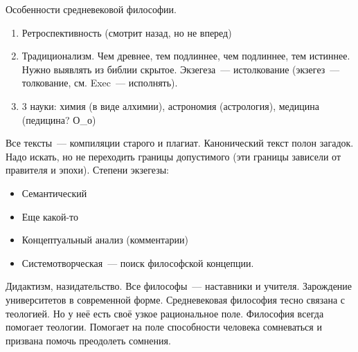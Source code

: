 Особенности средневековой философии.
\begin{enumerate}
	\item Ретроспективность (смотрит назад, но не вперед) 
	\item Традиционализм. Чем древнее, тем подлиннее, чем подлиннее, тем истиннее. Нужно выявлять из библии скрытое. Экзегеза~--- истолкование (экзегез~--- толкование, см. Exec~--- исполнять). 
	\item 3 науки: химия (в виде алхимии), астрономия (астрология), медицина (педицина? О\_о) 
\end{enumerate}
Все тексты~--- компиляции старого и плагиат.
Канонический текст полон загадок. Надо искать, но не переходить границы допустимого (эти границы зависели от правителя и эпохи). 
Степени экзегезы:

\begin{itemize}
	\item Семантический
	\item Еще какой-то
	\item Концептуальный анализ (комментарии) 
	\item Системотворческая~--- поиск философской концепции.
\end{itemize}
Дидактизм, назидательство. Все философы~--- наставники и учителя. Зарождение университетов в современной форме.
Средневековая философия тесно связана с теологией. Но у неё есть своё узкое рациональное поле. Философия всегда помогает теологии. Помогает на поле способности человека сомневаться и призвана помочь преодолеть сомнения.
